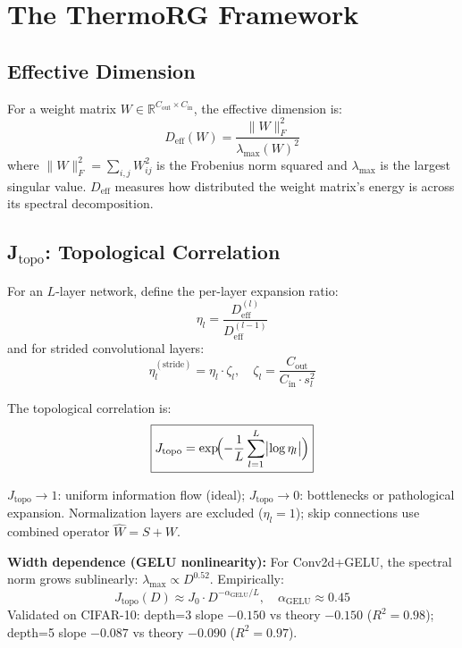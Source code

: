 \documentclass[11pt, a4paper]{article}
\theoremstyle{plain}
\begin{document}
\section{The ThermoRG Framework}

\subsection{Effective Dimension}

For a weight matrix $W \in \mathbb{R}^{C_{\mathrm{out}} \times C_{\mathrm{in}}}$, the effective dimension is:
\begin{equation}
D_{\mathrm{eff}}(W) = \frac{\|W\|_F^2}{\lambda_{\max}(W)^2}
\end{equation}
where $\|W\|_F^2 = \sum_{i,j} W_{ij}^2$ is the Frobenius norm squared and $\lambda_{\max}$ is the largest singular value. $D_{\mathrm{eff}}$ measures how distributed the weight matrix's energy is across its spectral decomposition.

\subsection{J$_{\mathrm{topo}}$: Topological Correlation}

For an $L$-layer network, define the per-layer expansion ratio:
\begin{equation}
\eta_l = \frac{D_{\mathrm{eff}}^{(l)}}{D_{\mathrm{eff}}^{(l-1)}}
\end{equation}
and for strided convolutional layers:
\begin{equation}
\eta_l^{(\mathrm{stride})} = \eta_l \cdot \zeta_l, \quad \zeta_l = \frac{C_{\mathrm{out}}}{C_{\mathrm{in}} \cdot s_l^2}
\end{equation}

The topological correlation is:
\begin{equation}
\boxed{J_{\mathrm{topo}} = \exp\!\Bigl(-\frac{1}{L}\sum_{l=1}^{L}\bigl|\log\eta_l\bigr|\Bigr)}
\end{equation}

$J_{\mathrm{topo}} \to 1$: uniform information flow (ideal); $J_{\mathrm{topo}} \to 0$: bottlenecks or pathological expansion. Normalization layers are excluded ($\eta_l = 1$); skip connections use combined operator $\widehat{W} = S + W$.

\textbf{Width dependence (GELU nonlinearity):} For Conv2d+GELU, the spectral norm grows sublinearly: $\lambda_{\max} \propto D^{0.52}$. Empirically:
\begin{equation}
\boxed{J_{\mathrm{topo}}(D) \approx J_0 \cdot D^{-\alpha_{\mathrm{GELU}}/L}}, \quad \alpha_{\mathrm{GELU}} \approx 0.45
\end{equation}
Validated on CIFAR-10: depth=3 slope $-0.150$ vs theory $-0.150$ ($R^2=0.98$); depth=5 slope $-0.087$ vs theory $-0.090$ ($R^2=0.97$).
\end{document}
